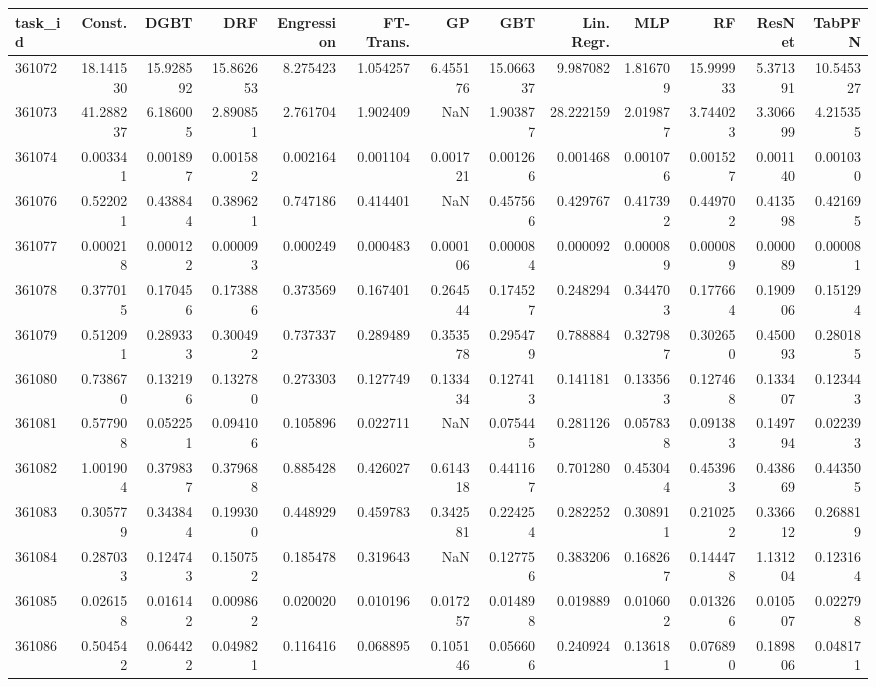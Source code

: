 \begin{tabular}{lrrrrrrrrrrrr}
\toprule
task\_id & Const. & DGBT & DRF & Engression & FT-Trans. & GP & GBT & Lin. Regr. & MLP & RF & ResNet & TabPFN \\
\midrule
361072 & 18.141530 & 15.928592 & 15.862653 & 8.275423 & 1.054257 & 6.455176 & 15.066337 & 9.987082 & 1.816709 & 15.999933 & 5.371391 & 10.545327 \\
361073 & 41.288237 & 6.186005 & 2.890851 & 2.761704 & 1.902409 & NaN & 1.903877 & 28.222159 & 2.019877 & 3.744023 & 3.306699 & 4.215355 \\
361074 & 0.003341 & 0.001897 & 0.001582 & 0.002164 & 0.001104 & 0.001721 & 0.001266 & 0.001468 & 0.001076 & 0.001527 & 0.001140 & 0.001030 \\
361076 & 0.522021 & 0.438844 & 0.389621 & 0.747186 & 0.414401 & NaN & 0.457566 & 0.429767 & 0.417392 & 0.449702 & 0.413598 & 0.421695 \\
361077 & 0.000218 & 0.000122 & 0.000093 & 0.000249 & 0.000483 & 0.000106 & 0.000084 & 0.000092 & 0.000089 & 0.000089 & 0.000089 & 0.000081 \\
361078 & 0.377015 & 0.170456 & 0.173886 & 0.373569 & 0.167401 & 0.264544 & 0.174527 & 0.248294 & 0.344703 & 0.177664 & 0.190906 & 0.151294 \\
361079 & 0.512091 & 0.289333 & 0.300492 & 0.737337 & 0.289489 & 0.353578 & 0.295479 & 0.788884 & 0.327987 & 0.302650 & 0.450093 & 0.280185 \\
361080 & 0.738670 & 0.132196 & 0.132780 & 0.273303 & 0.127749 & 0.133434 & 0.127413 & 0.141181 & 0.133563 & 0.127468 & 0.133407 & 0.123443 \\
361081 & 0.577908 & 0.052251 & 0.094106 & 0.105896 & 0.022711 & NaN & 0.075445 & 0.281126 & 0.057838 & 0.091383 & 0.149794 & 0.022393 \\
361082 & 1.001904 & 0.379837 & 0.379688 & 0.885428 & 0.426027 & 0.614318 & 0.441167 & 0.701280 & 0.453044 & 0.453963 & 0.438669 & 0.443505 \\
361083 & 0.305779 & 0.343844 & 0.199300 & 0.448929 & 0.459783 & 0.342581 & 0.224254 & 0.282252 & 0.308911 & 0.210252 & 0.336612 & 0.268819 \\
361084 & 0.287033 & 0.124743 & 0.150752 & 0.185478 & 0.319643 & NaN & 0.127756 & 0.383206 & 0.168267 & 0.144478 & 1.131204 & 0.123164 \\
361085 & 0.026158 & 0.016142 & 0.009862 & 0.020020 & 0.010196 & 0.017257 & 0.014898 & 0.019889 & 0.010602 & 0.013266 & 0.010507 & 0.022798 \\
361086 & 0.504542 & 0.064422 & 0.049821 & 0.116416 & 0.068895 & 0.105146 & 0.056606 & 0.240924 & 0.136181 & 0.076890 & 0.189806 & 0.048171 \\

\end{tabular}
